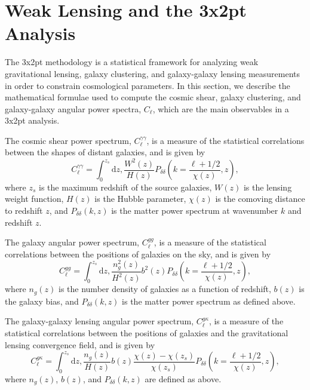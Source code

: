 \documentclass[twocolumn,draft]{aastex631}
\begin{document}
\section{Weak Lensing and the 3x2pt Analysis}

The 3x2pt methodology is a statistical framework for analyzing weak gravitational lensing, galaxy clustering, and galaxy-galaxy lensing measurements in order to constrain cosmological parameters. In this section, we describe the mathematical formulae used to compute the cosmic shear, galaxy clustering, and galaxy-galaxy angular power spectra, $C_\ell$, which are the main observables in a 3x2pt analysis.

The cosmic shear power spectrum, $C_\ell^{\gamma\gamma}$, is a measure of the statistical correlations between the shapes of distant galaxies, and is given by
\begin{equation}
C_\ell^{\gamma\gamma} = \int_0^{z_s} \mathrm{d}z, \frac{W^2(z)}{H(z)} P_{\delta\delta}\left(k = \frac{\ell + 1/2}{\chi(z)}, z\right),
\end{equation}
where $z_s$ is the maximum redshift of the source galaxies, $W(z)$ is the lensing weight function, $H(z)$ is the Hubble parameter, $\chi(z)$ is the comoving distance to redshift $z$, and $P_{\delta\delta}(k, z)$ is the matter power spectrum at wavenumber $k$ and redshift $z$.

The galaxy angular power spectrum, $C_\ell^{gg}$, is a measure of the statistical correlations between the positions of galaxies on the sky, and is given by
\begin{equation}
C_\ell^{gg} = \int_0^{z_s} \mathrm{d}z, \frac{n_g^2(z)}{H^2(z)} b^2(z) P_{\delta\delta}\left(k = \frac{\ell + 1/2}{\chi(z)}, z\right),
\end{equation}
where $n_g(z)$ is the number density of galaxies as a function of redshift, $b(z)$ is the galaxy bias, and $P_{\delta\delta}(k, z)$ is the matter power spectrum as defined above.

The galaxy-galaxy lensing angular power spectrum, $C_\ell^{g\kappa}$, is a measure of the statistical correlations between the positions of galaxies and the gravitational lensing convergence field, and is given by
\begin{equation}
C_\ell^{g\kappa} = \int_0^{z_s} \mathrm{d}z, \frac{n_g(z)}{H(z)} b(z) \frac{\chi(z) - \chi(z_s)}{\chi(z_s)} P_{\delta\delta}\left(k = \frac{\ell + 1/2}{\chi(z)}, z\right),
\end{equation}
where $n_g(z)$, $b(z)$, and $P_{\delta\delta}(k, z)$ are defined as above.
\end{document}
